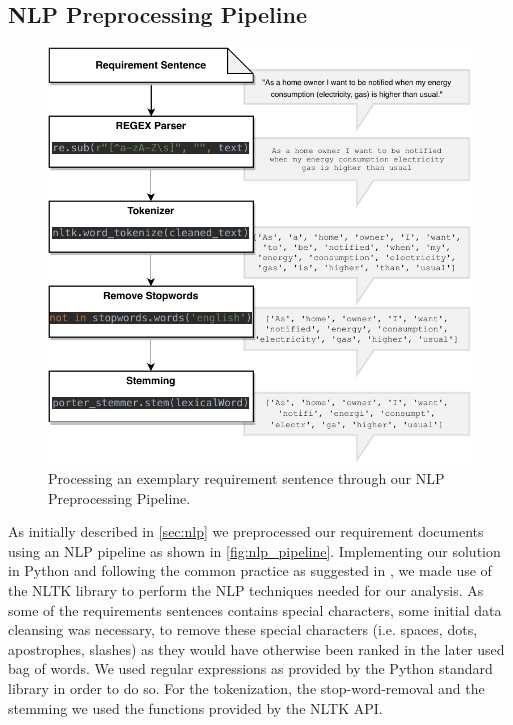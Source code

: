 \subsection{NLP Preprocessing Pipeline} %
\label{sub:own_pipeline}

\begin{figure}[ht]
  \centering
    \includegraphics[width=\textwidth]{figures/NLP Pipeline.pdf}
    \caption{Processing an exemplary requirement sentence through our NLP Preprocessing Pipeline.}
    \label{fig:nlp_pipeline}
\end{figure}

As initially described in \autoref{sec:nlp} we preprocessed our requirement documents using an NLP pipeline as shown in \autoref{fig:nlp_pipeline}. Implementing our solution in Python and following the common practice as suggested in \cite{ferrari_natural_2018}, we made use of the NLTK library \cite{nltk_library} to perform the NLP techniques needed for our analysis. As some of the requirements sentences contains special characters, some initial data cleansing was necessary, to remove these special characters (i.e. spaces, dots, apostrophes, slashes) as they would have otherwise been ranked in the later used bag of words. We used regular expressions as provided by the Python standard library in order to do so. For the tokenization, the stop-word-removal and the stemming we used the functions provided by the NLTK API.

